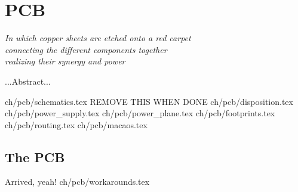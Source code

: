 \chapter {PCB}

\begin {flushright} {\slshape
    In which copper sheets are etched onto a red carpet\\
    connecting the different components together\\
    realizing their synergy and power
}
\end {flushright}
...Abstract...

 {ch/pcb/schematics.tex}
REMOVE THIS WHEN DONE
 {ch/pcb/disposition.tex}
 {ch/pcb/power_supply.tex}
 {ch/pcb/power_plane.tex}
 {ch/pcb/footprints.tex}
 {ch/pcb/routing.tex}
 {ch/pcb/macaos.tex}
\section {The PCB}
Arrived, yeah!
 {ch/pcb/workarounds.tex}
